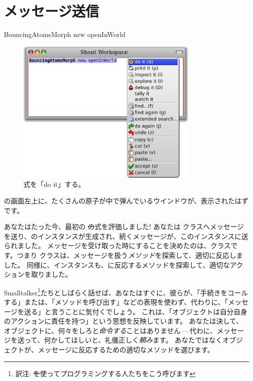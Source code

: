 \documentclass[a4paper,10pt,twoside]{book}
\begin{document}
\section{メッセージ送信}


\begin{code}{}
BouncingAtomsMorph new openInWorld
\end{code}


\begin{figure}[htb]
\centerline {\includegraphics[width=0.8\textwidth]{Doit}}
\caption{式を「do it」する。}
\end{figure}

\pharo の画面左上に、たくさんの原子が中で弾んでいるウインドウが、表示されたはずです。

あなたはたった今、最初の \st の式を評価しました!
あなたは \bam クラスへメッセージを送り、\bam のインスタンスが生成され、続くメッセージが、このインスタンスに送られました。
メッセージを受け取った時にすることを決めたのは、\bam クラスです。つまり \bam クラスは、メッセージを扱う\emph{メソッド}を探索して、適切に反応しました。
同様に、\bam インスタンスも、に反応するメソッドを探索して、適切なアクションを取りました。

Smalltalker\footnote{訳注: \st を使ってプログラミングする人たちをこう呼びます}たちとしばらく話せば、あなたはすぐに、彼らが、「手続きをコールする」または、「メソッドを呼び出す」などの表現を使わず、代わりに、「メッセージを送る」と言うことに気付くでしょう。
これは、「オブジェクトは自分自身のアクションに責任を持つ」という思想を反映しています。
あなたは決して、オブジェクトに、何々をしろと\emph{命令する}ことはありません\,---\,代わに、メッセージを送って、何かしてほしいと、礼儀正しく\emph{頼み}ます。
あなたではなくオブジェクトが、メッセージに反応するための適切なメソッドを選びます。
\end{document}
